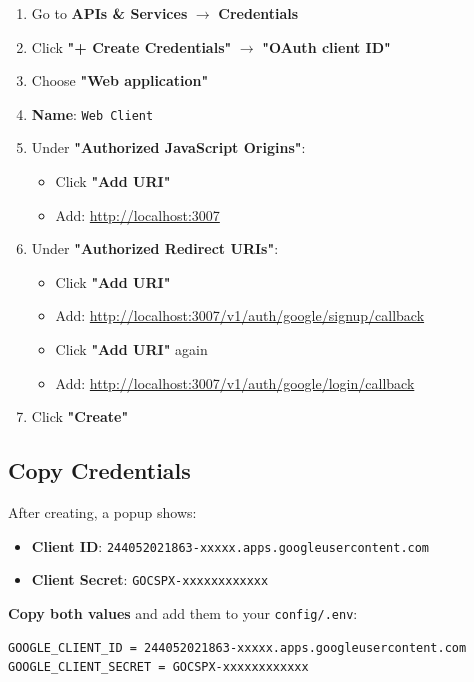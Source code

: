\documentclass[12pt,a4paper]{article}
\begin{document}
\begin{enumerate}[leftmargin=*,itemsep=0.5em]
    \item Go to \textbf{APIs \& Services} $\rightarrow$ \textbf{Credentials}
    \item Click \textbf{"+ Create Credentials"} $\rightarrow$ \textbf{"OAuth client ID"}
    \item Choose \textbf{"Web application"}
    \item \textbf{Name}: \texttt{Web Client}
    \item Under \textbf{"Authorized JavaScript Origins"}:
    \begin{itemize}
        \item Click \textbf{"Add URI"}
        \item Add: \url{http://localhost:3007}
    \end{itemize}
    \item Under \textbf{"Authorized Redirect URIs"}:
    \begin{itemize}
        \item Click \textbf{"Add URI"}
        \item Add: \url{http://localhost:3007/v1/auth/google/signup/callback}
        \item Click \textbf{"Add URI"} again
        \item Add: \url{http://localhost:3007/v1/auth/google/login/callback}
    \end{itemize}
    \item Click \textbf{"Create"}
\end{enumerate}

\subsection{Copy Credentials}

After creating, a popup shows:
\begin{itemize}
    \item \textbf{Client ID}: \texttt{244052021863-xxxxx.apps.googleusercontent.com}
    \item \textbf{Client Secret}: \texttt{GOCSPX-xxxxxxxxxxxx}
\end{itemize}

\begin{tcolorbox}[colback=yellow!10!white,colframe=warnyellow,title= Save These Values!]
    \textbf{Copy both values} and add them to your \texttt{config/.env}:
    
    \begin{lstlisting}
GOOGLE_CLIENT_ID = 244052021863-xxxxx.apps.googleusercontent.com
GOOGLE_CLIENT_SECRET = GOCSPX-xxxxxxxxxxxx
    \end{lstlisting}
\end{tcolorbox}
\end{document}
